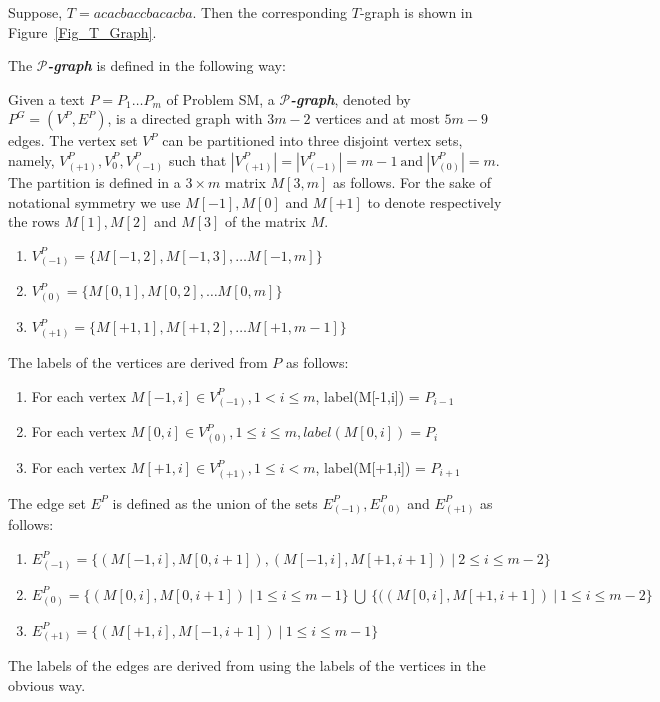 \documentclass{llncs}
\begin{document}
\begin{example}\label{Ex_T_Graph}
Suppose, $T = acacbaccbacacba$. Then the corresponding $T$-graph is
shown in Figure~\ref{Fig_T_Graph}.
\end{example}

\begin{definition}


The \textbf{\emph{$\mathcal P$-graph}} is defined in the following way:



Given a text $P=P_1\dots P_m$ of Problem SM, a
\textbf{\emph{$\mathcal P$-graph}}, denoted by $P^G = (V^P, E^P) $,
is a directed graph with $3m-2$ vertices and at most $5m-9$ edges.
The vertex set $V^P$ can be partitioned into three disjoint vertex
sets, namely, $V^P_{(+1)},V^P_{0},V^P_{(-1)}$ such that $|V^P_{(+1)}|
= |V^P_{(-1)}| = m -1 ~\text{and}~ |V^P_{(0)}| = m$. The partition
is defined in a $3\times m$ matrix $M[3,m]$ as follows. For the sake
of notational symmetry we use $M[-1], M[0]$ and $M[+1]$ to denote
respectively the rows $M[1], M[2]$ and $M[3]$ of the matrix $M$.
\begin{enumerate}
\item $V^P_{(-1)} = \{M[-1,2], M[-1,3], \ldots  M[-1,m]\}$
\item $V^P_{(0)} = \{M[0,1], M[0,2], \ldots  M[0,m]\}$
\item $V^P_{(+1)} = \{M[+1,1], M[+1,2], \ldots  M[+1,m-1]\}$
\end{enumerate}
The labels of the vertices are derived from $P$ as follows:



\begin{enumerate}
\item For each vertex $M[-1,i]\in V^P_{(-1)}, 1<i\leq m$,
label(M[-1,i]) =  $P_{i-1}$

\item For each vertex $M[0,i]\in V^P_{(0)}, 1\leq i\leq m, label(M[0,i]) =
P_i$
\item For each vertex $M[+1,i]\in V^P_{(+1)}, 1\leq i< m$,
label(M[+1,i]) = $P_{i+1}$


\end{enumerate}

The edge set $E^P$ is defined as the union of the sets $E^P_{(-1)},
E^P_{(0)}$ and $E^P_{(+1)}$ as follows:

\begin{enumerate}
\item $E^P_{(-1)} = \{(M[-1,i], M[0,i+1]), (M[-1,i], M[+1,i+1])~|~ 2\leq i\leq m-2\}$
\item $E^P_{(0)} = \{(M[0,i], M[0,i+1])~|~ 1\leq i\leq m-1\} ~\bigcup~ \{((M[0,i], M[+1,i+1])~|~ 1\leq i\leq m-2\}$
\item $E^P_{(+1)} = \{(M[+1,i], M[-1,i+1])~|~ 1\leq i\leq m-1\}$
\end{enumerate}

The labels of the edges are derived from using the labels of the
vertices in the obvious way.
\end{definition}
\end{document}
